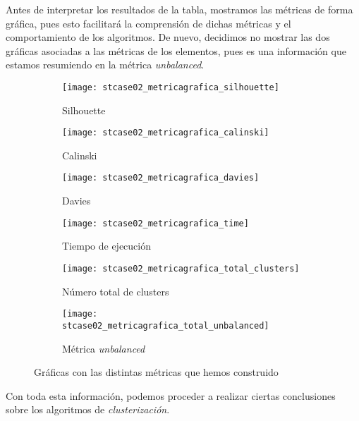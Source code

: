 \documentclass[11pt]{article}
\begin{document}
Antes de interpretar los resultados de la tabla, mostramos las métricas de forma gráfica, pues esto facilitará la comprensión de dichas métricas y el comportamiento de los algoritmos. De nuevo, decidimos no mostrar las dos gráficas asociadas a las métricas de los elementos, pues es una información que estamos resumiendo en la métrica \emph{unbalanced}.

\begin{figure}[H]
    \centering

    \begin{subfigure}[b]{0.45 \textwidth}
        \texttt{[image: stcase02\_metricagrafica\_silhouette]}
        \caption{Silhouette}
    \end{subfigure}
    \begin{subfigure}[b]{0.45 \textwidth}
        \texttt{[image: stcase02\_metricagrafica\_calinski]}
        \caption{Calinski}
    \end{subfigure}

    \begin{subfigure}[b]{0.45 \textwidth}
        \texttt{[image: stcase02\_metricagrafica\_davies]}
        \caption{Davies}
    \end{subfigure}
    \begin{subfigure}[b]{0.45 \textwidth}
        \texttt{[image: stcase02\_metricagrafica\_time]}
        \caption{Tiempo de ejecución}
    \end{subfigure}

    \begin{subfigure}[b]{0.45 \textwidth}
        \texttt{[image: stcase02\_metricagrafica\_total\_clusters]}
        \caption{Número total de clusters}
    \end{subfigure}
    \begin{subfigure}[b]{0.45 \textwidth}
        \texttt{[image: stcase02\_metricagrafica\_total\_unbalanced]}
        \caption{Métrica \emph{unbalanced}}
    \end{subfigure}

    \caption{Gráficas con las distintas métricas que hemos construido}
    \label{stcase02_metricas_graficas:figure}
\end{figure}

Con toda esta información, podemos proceder a realizar ciertas conclusiones sobre los algoritmos de \emph{clusterización}.

\pagebreak
\end{document}
